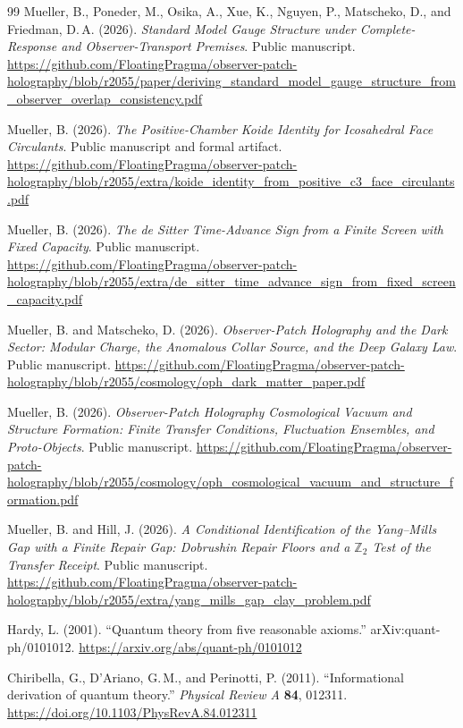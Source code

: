 \documentclass[11pt]{article}
\theoremstyle{definition}
\theoremstyle{remark}
\begin{document}
{\begin{thebibliography}{99}
Mueller, B., Poneder, M., Osika, A., Xue, K., Nguyen, P., Matscheko, D., and Friedman, D.\,A. (2026).
 \emph{Standard Model Gauge Structure under Complete-Response and Observer-Transport Premises}. Public manuscript.
\url{https://github.com/FloatingPragma/observer-patch-holography/blob/r2055/paper/deriving_standard_model_gauge_structure_from_observer_overlap_consistency.pdf}

Mueller, B. (2026). \emph{The Positive-Chamber Koide Identity for
Icosahedral Face Circulants}. Public manuscript and formal artifact.
\url{https://github.com/FloatingPragma/observer-patch-holography/blob/r2055/extra/koide_identity_from_positive_c3_face_circulants.pdf}

Mueller, B. (2026). \emph{The de Sitter Time-Advance Sign from a Finite
Screen with Fixed Capacity}. Public manuscript.
\url{https://github.com/FloatingPragma/observer-patch-holography/blob/r2055/extra/de_sitter_time_advance_sign_from_fixed_screen_capacity.pdf}

Mueller, B. and Matscheko, D. (2026). \emph{Observer-Patch Holography and the
Dark Sector: Modular Charge, the Anomalous Collar Source, and the Deep Galaxy
Law}. Public manuscript.
\url{https://github.com/FloatingPragma/observer-patch-holography/blob/r2055/cosmology/oph_dark_matter_paper.pdf}

Mueller, B. (2026). \emph{Observer-Patch Holography Cosmological Vacuum and
Structure Formation: Finite Transfer Conditions, Fluctuation Ensembles, and
Proto-Objects}. Public manuscript.
\url{https://github.com/FloatingPragma/observer-patch-holography/blob/r2055/cosmology/oph_cosmological_vacuum_and_structure_formation.pdf}

Mueller, B. and Hill, J. (2026). \emph{A Conditional Identification of the Yang--Mills Gap with a Finite Repair Gap: Dobrushin Repair Floors and a \(\mathbb Z_2\) Test of the Transfer Receipt}. Public manuscript.
\url{https://github.com/FloatingPragma/observer-patch-holography/blob/r2055/extra/yang_mills_gap_clay_problem.pdf}

Hardy, L. (2001). ``Quantum theory from five reasonable axioms.''
arXiv:quant-ph/0101012.
\url{https://arxiv.org/abs/quant-ph/0101012}

Chiribella, G., D'Ariano, G.\,M., and Perinotti, P. (2011).
``Informational derivation of quantum theory.''
\emph{Physical Review A} \textbf{84}, 012311.
\url{https://doi.org/10.1103/PhysRevA.84.012311}


\end{thebibliography}}
\end{document}
